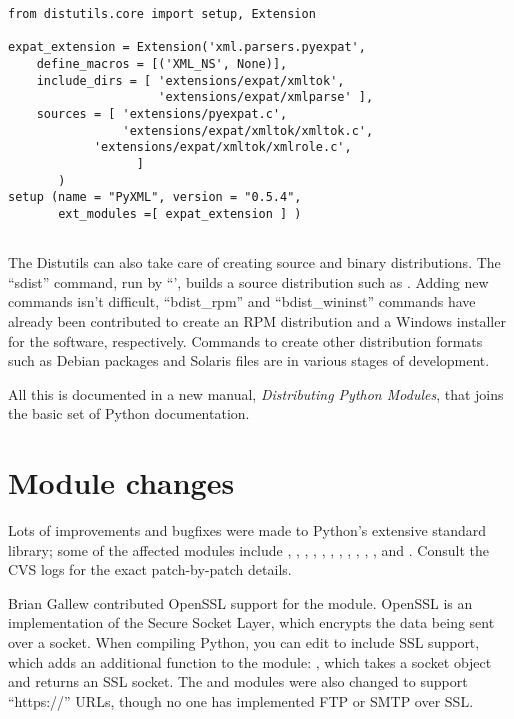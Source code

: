 \documentclass{howto}
\begin{document}
\begin{verbatim}
from distutils.core import setup, Extension

expat_extension = Extension('xml.parsers.pyexpat',
	define_macros = [('XML_NS', None)],
	include_dirs = [ 'extensions/expat/xmltok',
	                 'extensions/expat/xmlparse' ],
	sources = [ 'extensions/pyexpat.c',
	            'extensions/expat/xmltok/xmltok.c',
 		    'extensions/expat/xmltok/xmlrole.c',
                  ]
       )
setup (name = "PyXML", version = "0.5.4", 
       ext_modules =[ expat_extension ] )
	        
\end{verbatim}

The Distutils can also take care of creating source and binary
distributions.  The ``sdist'' command, run by ``', builds a source distribution such as .
Adding new commands isn't difficult, ``bdist_rpm'' and
``bdist_wininst'' commands have already been contributed to create an
RPM distribution and a Windows installer for the software,
respectively.  Commands to create other distribution formats such as
Debian packages and Solaris  files are in various stages of
development.

All this is documented in a new manual, \textit{Distributing Python
Modules}, that joins the basic set of Python documentation.



\section{Module changes}

Lots of improvements and bugfixes were made to Python's extensive
standard library; some of the affected modules include
, , ,
, , , ,
, , , ,
and .  Consult the CVS logs for the exact
patch-by-patch details.  

Brian Gallew contributed OpenSSL support for the 
module.  OpenSSL is an implementation of the Secure Socket Layer,
which encrypts the data being sent over a socket.  When compiling
Python, you can edit  to include SSL support,
which adds an additional function to the  module:
,
which takes a socket object and returns an SSL socket.  The
 and  modules were also changed to
support ``https://'' URLs, though no one has implemented FTP or SMTP
over SSL.  
\end{document}
